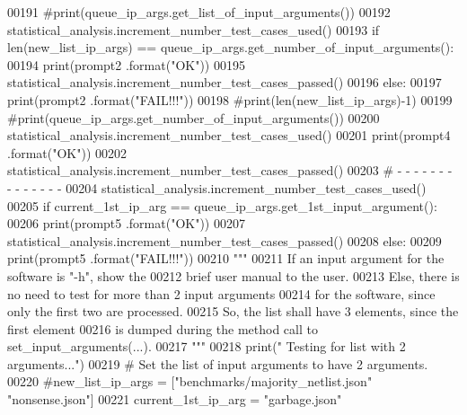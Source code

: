 \begin{DoxyCode}
00191             \textcolor{comment}{#print(queue\_ip\_args.get\_list\_of\_input\_arguments())}
00192         statistical\_analysis.increment\_number\_test\_cases\_used()
00193         \textcolor{keywordflow}{if} len(new\_list\_ip\_args) == queue\_ip\_args.get\_number\_of\_input\_arguments():
00194             print(prompt2 .format(\textcolor{stringliteral}{"OK"}))
00195             statistical\_analysis.increment\_number\_test\_cases\_passed()
00196         \textcolor{keywordflow}{else}:
00197             print(prompt2 .format(\textcolor{stringliteral}{"FAIL!!!"}))
00198             \textcolor{comment}{#print(len(new\_list\_ip\_args)-1)}
00199             \textcolor{comment}{#print(queue\_ip\_args.get\_number\_of\_input\_arguments())}
00200         statistical\_analysis.increment\_number\_test\_cases\_used()
00201         print(prompt4 .format(\textcolor{stringliteral}{"OK"}))
00202         statistical\_analysis.increment\_number\_test\_cases\_passed()
00203         \textcolor{comment}{#   -   -   -   -   -   -   -   -   -   -   -   -   -   -}
00204         statistical\_analysis.increment\_number\_test\_cases\_used()
00205         \textcolor{keywordflow}{if} current\_1st\_ip\_arg == queue\_ip\_args.get\_1st\_input\_argument():
00206             print(prompt5 .format(\textcolor{stringliteral}{"OK"}))
00207             statistical\_analysis.increment\_number\_test\_cases\_passed()
00208         \textcolor{keywordflow}{else}:
00209             print(prompt5 .format(\textcolor{stringliteral}{"FAIL!!!"}))
00210         \textcolor{stringliteral}{"""}
00211 \textcolor{stringliteral}{            If an input argument for the software is "-h", show the}
00212 \textcolor{stringliteral}{                brief user manual to the user.}
00213 \textcolor{stringliteral}{            Else, there is no need to test for more than 2 input arguments}
00214 \textcolor{stringliteral}{                for the software, since only the first two are processed.}
00215 \textcolor{stringliteral}{            So, the list shall have 3 elements, since the first element}
00216 \textcolor{stringliteral}{                is dumped during the method call to set\_input\_arguments(...).}
00217 \textcolor{stringliteral}{        """}
00218         print(\textcolor{stringliteral}{" Testing for list with 2 arguments..."})
00219         \textcolor{comment}{#   Set the list of input arguments to have 2 arguments.}
00220         \textcolor{comment}{#new\_list\_ip\_args = ["benchmarks/majority\_netlist.json" "nonsense.json"]}
00221         current\_1st\_ip\_arg = \textcolor{stringliteral}{"garbage.json"}

\end{DoxyCode}
